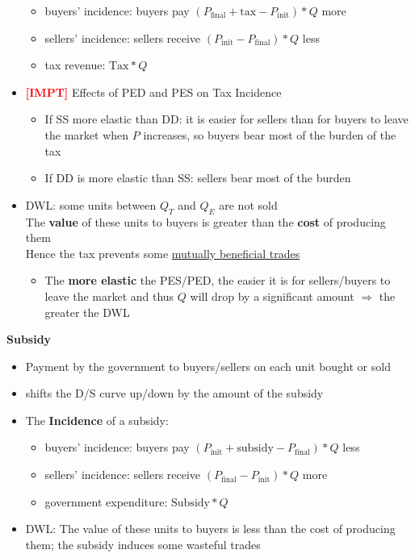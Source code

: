 \documentclass{article}
\newcommand{\impt}[0]{\textcolor{red}{\textbf{[IMPT] }}}
\begin{document}
\begin{multicols}{2}
\begin{itemize}
\begin{itemize}
	\item buyers' incidence: buyers pay $(P_{\text{final}}+\text{tax}-P_{\text{init}})*Q$ more
	\item sellers' incidence: sellers receive $(P_{\text{init}}-P_{\text{final}})*Q$ less
	\item tax revenue: $\text{Tax}*Q$
\end{itemize}
\item \impt Effects of PED and PES on Tax Incidence
\begin{itemize}
	\item If SS more elastic than DD: it is easier for sellers than for buyers to leave the market when $P$ increases, so buyers bear most of the burden of the tax
	\item If DD is more elastic than SS: sellers bear most of the burden
\end{itemize}
\item DWL: some units between $Q_T$ and $Q_E$ are not sold\\
The \textbf{value} of these units to buyers is greater than the \textbf{cost} of producing them\\
Hence the tax prevents some \underline{mutually beneficial trades}
\begin{itemize}
	\item The \textbf{more elastic} the PES/PED, the easier it is for sellers/buyers to leave the market and thus $Q$ will drop by a significant amount $\Rightarrow$ the greater the DWL
\end{itemize}
\end{itemize}
\textbf{Subsidy}
\begin{itemize}
	\item Payment by the government to buyers/sellers on each unit bought or sold
	\item shifts the D/S curve up/down by the amount of the subsidy
	\item The \textbf{Incidence} of a subsidy:
	\begin{itemize}
		\item buyers' incidence: buyers pay $(P_{\text{init}}+\text{subsidy}-P_{\text{final}})*Q$ less
		\item sellers' incidence: sellers receive $(P_{\text{final}}-P_{\text{init}})*Q$ more
		\item government expenditure: $\text{Subsidy}*Q$
	\end{itemize}
\item DWL: The value of these units to buyers is less than the cost of producing them; the subsidy induces some wasteful trades
\end{itemize}

\end{multicols}
\end{document}
